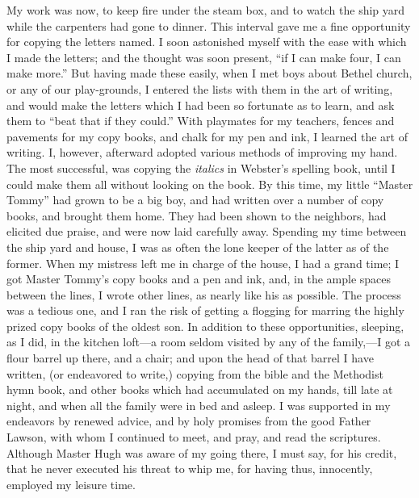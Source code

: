 My work was now, to keep fire under the steam box, and to watch the ship
yard while the carpenters had gone to dinner. This interval gave me a
fine opportunity for copying the letters named. I soon astonished myself
with the ease with which I made the letters; and the thought was soon
present, ``if I can make four, I can make more.'' But having made these
easily, when I met boys about Bethel church, or any of our play-grounds,
I entered the lists with them in the art of writing, and would make the
letters which I had been so fortunate as to learn, and ask them to
``beat that if they could.'' With playmates for my teachers, fences and
pavements for my copy books, and chalk for my pen and ink, I learned the
art of writing. I, however, afterward adopted various methods of
improving my hand. The most successful, was copying the \emph{italics}
in Webster's spelling book, until I could make them all without looking
on the book. By this time, my little ``Master Tommy'' had grown to be a
big boy, and had written over a number of copy books, and brought them
{\protect\hypertarget{172}{}{}}home. They had been shown to the
neighbors, had elicited due praise, and were now laid carefully away.
Spending my time between the ship yard and house, I was as often the
lone keeper of the latter as of the former. When my mistress left me in
charge of the house, I had a grand time; I got Master Tommy's copy books
and a pen and ink, and, in the ample spaces between the lines, I wrote
other lines, as nearly like his as possible. The process was a tedious
one, and I ran the risk of getting a flogging for marring the highly
prized copy books of the oldest son. In addition to these opportunities,
sleeping, as I did, in the kitchen loft---a room seldom visited by any
of the family,---I got a flour barrel up there, and a chair; and upon
the head of that barrel I have written, (or endeavored to write,)
copying from the bible and the Methodist hymn book, and other books
which had accumulated on my hands, till late at night, and when all the
family were in bed and asleep. I was supported in my endeavors by
renewed advice, and by holy promises from the good Father Lawson, with
whom I continued to meet, and pray, and read the scriptures. Although
Master Hugh was aware of my going there, I must say, for his credit,
that he never executed his threat to whip me, for having thus,
innocently, employed my leisure time.
